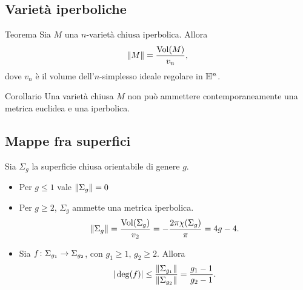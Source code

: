 \documentclass{beamer}
\begin{document}
\subsection{Varietà iperboliche}
\begin{frame}{\secname}{\subsecname}
\begin{block}{Teorema}
Sia $M$ una $n$-varietà chiusa iperbolica. Allora
\[
\left\lVert M\right\rVert=\frac{\operatorname{Vol}(M)}{v_n},
\]
dove $v_n$ è il volume dell'$n$-simplesso ideale regolare in $\mathbb{H}^n$.
\end{block}
\begin{block}{Corollario}
Una varietà chiusa $M$ non può ammettere contemporaneamente una metrica euclidea e una iperbolica.
\end{block}
\end{frame}
\subsection{Mappe fra superfici}
\begin{frame}{\secname}{\subsecname}
Sia $\Sigma_g$ la superficie chiusa orientabile di genere $g$.
\begin{itemize}
\item Per $g\le 1$ vale $\left\lVert \Sigma_g\right\rVert=0$
\item Per $g\ge 2$, $\Sigma_g$ ammette una metrica iperbolica.
\[
\left\lVert \Sigma_g\right\rVert=\frac{\operatorname{Vol}(\Sigma_g)}{v_2}=-\frac{2\pi\chi(\Sigma_g)}{\pi}=4g-4.
\]
\item Sia $\map{f}{\Sigma_{g_1}}{\Sigma_{g_2}}$, con $g_1\ge 1$, $g_2\ge 2$. Allora
\[
|\deg(f)|\le\frac{\left\lVert \Sigma_{g_1}\right\rVert}{\left\lVert \Sigma_{g_2}\right\rVert}=\frac{g_1-1}{g_2-1}.
\]
\end{itemize}
\end{frame}
\end{document}
